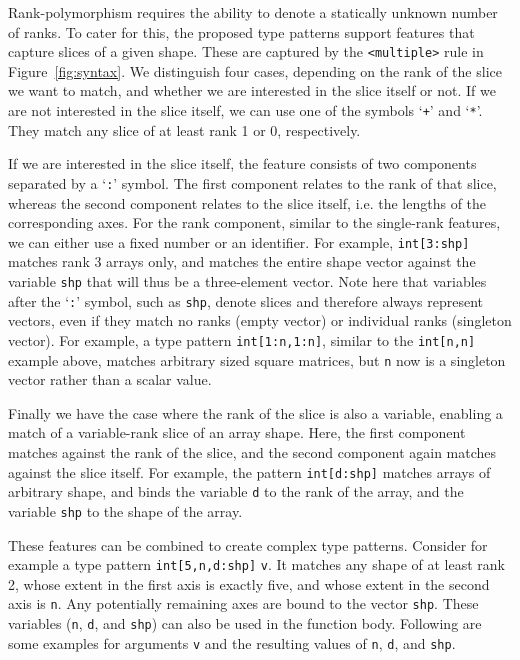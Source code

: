 Rank-polymorphism requires the ability to denote a statically unknown number of ranks.
To cater for this, the proposed type patterns support features that capture slices of a given shape.
These are captured by the \verb|<multiple>| rule in Figure~\ref{fig:syntax}.
We distinguish four cases, depending on the rank of the slice we want to match, and whether we are interested in the slice itself or not.
If we are not interested in the slice itself, we can use one of the symbols `\texttt{+}' and `\texttt{*}'.
They match any slice of at least rank 1 or 0, respectively.

If we are interested in the slice itself, the feature consists of two components separated by a `\texttt{:}' symbol.
The first component relates to the rank of that slice, whereas the second component relates to the slice itself, i.e. the lengths of the corresponding axes.
For the rank component, similar to the single-rank features, we can either use a fixed number or an identifier.
For example, \texttt{int[3:shp]} matches rank 3 arrays only, and matches the entire shape vector against the variable \texttt{shp} that will thus be a three-element vector.
Note here that variables after the `\texttt{:}' symbol, such as \texttt{shp}, denote slices and therefore always represent vectors, even if they match no ranks (empty vector) or individual ranks (singleton vector).
For example, a type pattern \texttt{int[1:n,1:n]}, similar to the \texttt{int[n,n]} example above, matches arbitrary sized square matrices, but \texttt{n} now is a singleton vector rather than a scalar value. 

Finally we have the case where the rank of the slice is also a variable, enabling a match of a variable-rank slice of an array shape.
Here, the first component matches against the rank of the slice, and the second component again matches against the slice itself.
For example, the pattern \texttt{int[d:shp]} matches arrays of arbitrary shape, and binds the variable \texttt{d} to the rank of the array, and the variable \texttt{shp} to the shape of the array.

These features can be combined to create complex type patterns.
Consider for example a type pattern \texttt{int[5,n,d:shp]} \texttt{v}.
It matches any shape of at least rank 2, whose extent in the first axis is exactly five, and whose extent in the second axis is \texttt{n}.
Any potentially remaining axes are bound to the vector \texttt{shp}.
These variables (\texttt{n}, \texttt{d}, and \texttt{shp}) can also be used in the function body.
Following are some examples for arguments \texttt{v} and the resulting values of \texttt{n}, \texttt{d}, and \texttt{shp}.

